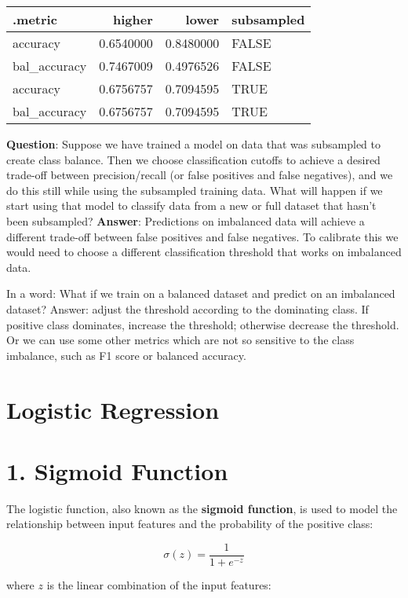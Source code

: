 \documentclass[
]{article}
\begin{document}
\begin{longtable}[]{@{}lrrl@{}}
\toprule\noalign{}
.metric & higher & lower & subsampled \\
\midrule\noalign{}
\endhead
\bottomrule\noalign{}
\endlastfoot
accuracy & 0.6540000 & 0.8480000 & FALSE \\
bal\_accuracy & 0.7467009 & 0.4976526 & FALSE \\
accuracy & 0.6756757 & 0.7094595 & TRUE \\
bal\_accuracy & 0.6756757 & 0.7094595 & TRUE \\
\end{longtable}

\textbf{Question}: Suppose we have trained a model on data that was
subsampled to create class balance. Then we choose classification
cutoffs to achieve a desired trade-off between precision/recall (or
false positives and false negatives), and we do this still while using
the subsampled training data. What will happen if we start using that
model to classify data from a new or full dataset that hasn't been
subsampled? \textbf{Answer}: Predictions on imbalanced data will achieve
a different trade-off between false positives and false negatives. To
calibrate this we would need to choose a different classification
threshold that works on imbalanced data.

In a word: What if we train on a balanced dataset and predict on an
imbalanced dataset? Answer: adjust the threshold according to the
dominating class. If positive class dominates, increase the threshold;
otherwise decrease the threshold. Or we can use some other metrics which
are not so sensitive to the class imbalance, such as F1 score or
balanced accuracy.

\section{Logistic Regression}\label{logistic-regression}

\section{1. Sigmoid Function}\label{sigmoid-function}

The logistic function, also known as the \textbf{sigmoid function}, is
used to model the relationship between input features and the
probability of the positive class:

\[
\sigma(z) = \frac{1}{1 + e^{-z}}
\]

where \(z\) is the linear combination of the input features:
\end{document}
